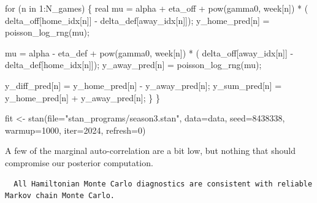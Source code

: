 \documentclass[
  letterpaper,
  DIV=11,
  numbers=noendperiod]{scrartcl}
\newenvironment{Shaded}{\begin{snugshade}}{\end{snugshade}}
\newcommand{\AttributeTok}[1]{\textcolor[rgb]{0.40,0.45,0.13}{#1}}
\newcommand{\ControlFlowTok}[1]{\textcolor[rgb]{0.00,0.23,0.31}{#1}}
\newcommand{\DataTypeTok}[1]{\textcolor[rgb]{0.68,0.00,0.00}{#1}}
\newcommand{\DecValTok}[1]{\textcolor[rgb]{0.68,0.00,0.00}{#1}}
\newcommand{\FunctionTok}[1]{\textcolor[rgb]{0.28,0.35,0.67}{#1}}
\newcommand{\NormalTok}[1]{\textcolor[rgb]{0.00,0.23,0.31}{#1}}
\newcommand{\OtherTok}[1]{\textcolor[rgb]{0.00,0.23,0.31}{#1}}
\newcommand{\SpecialCharTok}[1]{\textcolor[rgb]{0.37,0.37,0.37}{#1}}
\newcommand{\StringTok}[1]{\textcolor[rgb]{0.13,0.47,0.30}{#1}}
\begin{document}
\begin{codelisting}
\begin{Shaded}
\begin{Highlighting}[]
  \ControlFlowTok{for}\NormalTok{ (n }\ControlFlowTok{in} \DecValTok{1}\NormalTok{:N\_games) \{}
    \DataTypeTok{real}\NormalTok{ mu =  alpha + eta\_off}
\NormalTok{             + pow(gamma0, week[n]) * (  delta\_off[home\_idx[n]]}
\NormalTok{                                       {-} delta\_def[away\_idx[n]]);}
\NormalTok{    y\_home\_pred[n] = poisson\_log\_rng(mu);}

\NormalTok{    mu =  alpha {-} eta\_def}
\NormalTok{        + pow(gamma0, week[n]) * (  delta\_off[away\_idx[n]]}
\NormalTok{                                  {-} delta\_def[home\_idx[n]]);}
\NormalTok{    y\_away\_pred[n] = poisson\_log\_rng(mu);}

\NormalTok{    y\_diff\_pred[n] = y\_home\_pred[n] {-} y\_away\_pred[n];}
\NormalTok{    y\_sum\_pred[n] = y\_home\_pred[n] + y\_away\_pred[n];}
\NormalTok{  \}}
\NormalTok{\}}
\end{Highlighting}
\end{Shaded}

\end{codelisting}

\begin{Shaded}
\begin{Highlighting}[]
\NormalTok{fit }\OtherTok{\textless{}{-}} \FunctionTok{stan}\NormalTok{(}\AttributeTok{file=}\StringTok{"stan\_programs/season3.stan"}\NormalTok{,}
            \AttributeTok{data=}\NormalTok{data, }\AttributeTok{seed=}\DecValTok{8438338}\NormalTok{,}
            \AttributeTok{warmup=}\DecValTok{1000}\NormalTok{, }\AttributeTok{iter=}\DecValTok{2024}\NormalTok{, }\AttributeTok{refresh=}\DecValTok{0}\NormalTok{)}
\end{Highlighting}
\end{Shaded}

A few of the marginal auto-correlation are a bit low, but nothing that
should compromise our posterior computation.

\begin{Shaded}
\end{Shaded}

\begin{verbatim}
  All Hamiltonian Monte Carlo diagnostics are consistent with reliable
Markov chain Monte Carlo.
\end{verbatim}
\end{document}
